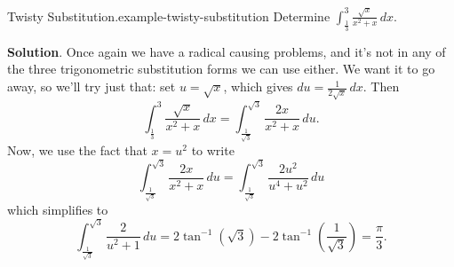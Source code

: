 \documentclass[10pt,]{book}
\numberwithin{equation}{section}
\begin{document}
\begin{example}{Twisty Substitution.}{example-twisty-substitution}%
\hypertarget{p-572}{}%
Determine \(\int_{\frac{1}{3}}^{3}\frac{\sqrt{x}}{x^{2} + x}\,dx.\)%
\par\smallskip%
\noindent\textbf{Solution}.\hypertarget{solution-125}{}\quad%
\hypertarget{p-573}{}%
Once again we have a radical causing problems, and it's not in any of the three trigonometric substitution forms we can use either. We want it to go away, so we'll try just that: set \(u = \sqrt{x}\), which gives \(du = \frac{1}{2\sqrt{x}}\,dx\). Then%
\begin{equation*}
\int_{\frac{1}{3}}^{3}\frac{\sqrt{x}}{x^{2} + x}\,dx = \int_{\frac{1}{\sqrt{3}}}^{\sqrt{3}}\frac{2x}{x^{2} + x}\,du.
\end{equation*}
Now, we use the fact that \(x = u^{2}\) to write%
\begin{equation*}
\int_{\frac{1}{\sqrt{3}}}^{\sqrt{3}}\frac{2x}{x^{2} + x}\,du = \int_{\frac{1}{\sqrt{3}}}^{\sqrt{3}}\frac{2u^{2}}{u^{4} + u^{2}}\,du
\end{equation*}
which simplifies to%
\begin{equation*}
\int_{\frac{1}{\sqrt{3}}}^{\sqrt{3}}\frac{2}{u^{2} + 1}\,du = 2\tan^{-1}(\sqrt{3}) - 2\tan^{-1}\left(\frac{1}{\sqrt{3}}\right) = \frac{\pi}{3}.
\end{equation*}
%
\end{example}
%
%
\typeout{************************************************}
\typeout{************************************************}
%
\end{document}
